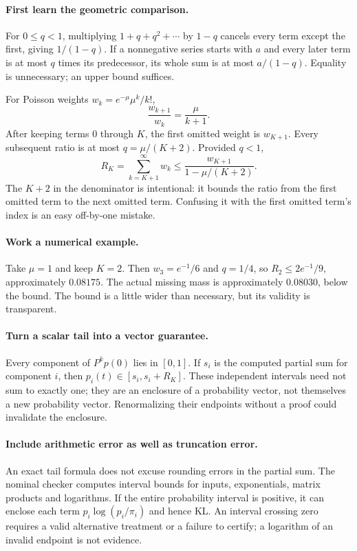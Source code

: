 \paragraph{First learn the geometric comparison.}
For $0\leq q<1$, multiplying $1+q+q^2+\cdots$ by $1-q$ cancels every
term except the first, giving $1/(1-q)$. If a nonnegative series starts with
$a$ and every later term is at most $q$ times its predecessor, its whole sum
is at most $a/(1-q)$. Equality is unnecessary; an upper bound suffices.

For Poisson weights $w_k=e^{-\mu}\mu^k/k!$,
\[
 \frac{w_{k+1}}{w_k}=\frac{\mu}{k+1}.
\]
After keeping terms $0$ through $K$, the first omitted weight is $w_{K+1}$.
Every subsequent ratio is at most $q=\mu/(K+2)$. Provided $q<1$,
\[
 R_K=\sum_{k=K+1}^\infty w_k
 \leq\frac{w_{K+1}}{1-\mu/(K+2)}.
\]
The $K+2$ in the denominator is intentional: it bounds the ratio from the
first omitted term to the next omitted term. Confusing it with the first
omitted term's index is an easy off-by-one mistake.

\paragraph{Work a numerical example.}
Take $\mu=1$ and keep $K=2$. Then $w_3=e^{-1}/6$ and $q=1/4$, so
$R_2\leq 2e^{-1}/9$, approximately $0.08175$. The actual missing mass
is approximately $0.08030$, below the bound. The bound is a little wider
than necessary, but its validity is transparent.

\paragraph{Turn a scalar tail into a vector guarantee.}
Every component of $P^kp(0)$ lies in $[0,1]$. If $s_i$ is the computed
partial sum for component $i$, then $p_i(t)\in[s_i,s_i+R_K]$.
These independent intervals need not sum to exactly one; they are an
enclosure of a probability vector, not themselves a new probability vector.
Renormalizing their endpoints without a proof could invalidate the enclosure.

\paragraph{Include arithmetic error as well as truncation error.}
An exact tail formula does not excuse rounding errors in the partial sum.
The nominal checker computes interval bounds for inputs, exponentials,
matrix products and logarithms. If the entire probability interval is
positive, it can enclose each term $p_i\log(p_i/\pi_i)$ and hence KL.
An interval crossing zero requires a valid alternative treatment or a
failure to certify; a logarithm of an invalid endpoint is not evidence.

